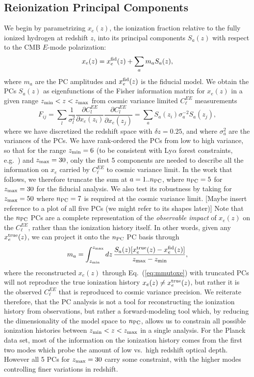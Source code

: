 \documentclass[prd,twocolumn,amsmath,amssymb,floatfix,superscriptaddress,nofootinbib]{revtex4-1}
\newcommand{\xef}{x_e^{\rm fid}}
\newcommand{\zmax}{z_{\rm max}}
\newcommand{\zmin}{z_{\rm min}}
\newcommand{\beq}{\begin{equation}}
\newcommand{\eeq}{\end{equation}}
\begin{document}
%
%
\subsection{Reionization Principal Components}
\label{sec:PC}
We begin by parametrizing $x_e(z)$, the ionization fraction relative to the fully ionized hydrogen at redshift $z$, into its principal components $S_{a}(z)$ with respect to the CMB $E$-mode polarization:
%
\begin{equation}
x_e(z)=\xef(z)+\sum_{a}m_{a}S_{a}(z),
\label{eq:mmutoxe}
\end{equation}
%
where $m_a$ are the PC amplitudes and $\xef(z)$ is the fiducial model. We obtain the PCs $S_{a}(z)$ as eigenfunctions of the Fisher information matrix for $x_e(z)$ in a given range $z_{\rm min}<z<z_{\rm max}$ from cosmic variance limited $C_\ell^{EE}$ measurements 
%
\beq
F_{ij} = \sum_l \frac{1}{\sigma_l^2} \frac{\partial C_l^{EE}}{\partial x_e(z_i)}\frac{\partial C_l^{EE}}{\partial x_e(z_j)} = \sum_a S_a(z_i) \sigma_a^{-2} S_a(z_j),
\eeq
%
where we have discretized the redshift space with $\delta z= 0.25$, and where $\sigma_a^2$ are the variances of the PCs. We have rank-ordered the PCs from low to high variance, so that for the range $z_{\rm min} = 6$ (to be consistent with Ly$\alpha$ forest constraints, e.g.~\cite{Becker:2015lua}) and $z_{\rm max} = 30$, only the first 5 components are needed to describe all the information on $x_e$ carried by $C_\ell^{EE}$ to cosmic variance limit. In the work that follows, we therefore truncate the sum at $a = 1 .. n_{\rm{PC}}$, where $n_{\rm{PC}} = 5$ for $z_{\rm max} = 30$ for the fiducial analysis. 
We also test its robustness by taking 
 for $z_{\rm max} = 50$ where $n_{\rm{PC}} = 7$ is required at the cosmic variance limit.
[Maybe insert reference to a plot of all five PCs (we might refer to its shapes later)]
Note that the $n_{\rm PC}$ PCs are a complete representation of the \textit{observable impact} of $x_e(z)$ on the $C_\ell^{EE}$, rather than the ionization history itself. In other words, 
given any $x_e^{\rm true}(z)$, we can project it onto the $n_{\rm PC}$ PC basis through
\begin{equation}
m_{a}=
  \int _{\zmin}^{\zmax} dz\, \frac{S_{a}(z) [x_e^{\rm true}(z)-\xef(z)]}{\zmax-\zmin},
\label{eq:xetommu}
\end{equation}
%
where the reconstructed $x_e(z)$ through Eq.~(\ref{eq:mmutoxe}) with truncated PCs will not reproduce the true ionization history $x_e(z) \neq x_e^{\rm true}(z)$, but rather it is the observed $C_\ell^{EE}$ that is reproduced to cosmic variance precision. We reiterate therefore, that the PC analysis is not a tool for reconstructing the ionization history from observations, but rather a forward-modeling tool which, by reducing the dimensionality of the model space to $n_{\rm PC}$, allows us to constrain all possible ionization histories between $z_{\rm min}<z<z_{\rm max}$ in a single analysis.
For the Planck data set, most of the information on the ionization history comes from the first two modes which probe the amount of low vs.\ high redshift optical depth.   However all 5 PCs for $z_{\rm max}=30$ carry some constraint, with the higher modes controlling finer variations in redshift.
\end{document}
